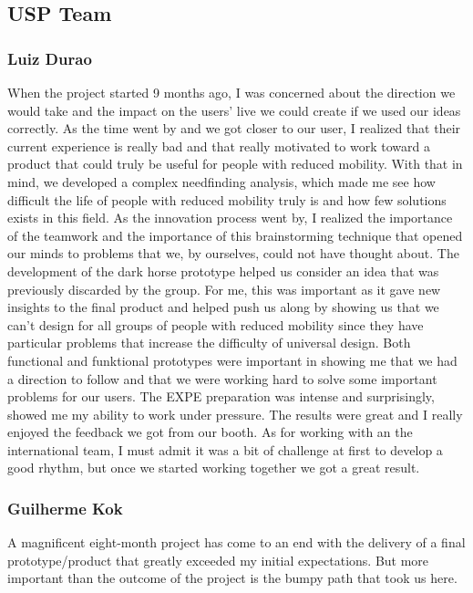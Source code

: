 \subsection{USP Team}

\subsubsection{Luiz Durao}

        	When the project started 9 months ago, I was concerned about the direction we would take and the impact on the users' live we could create if we used our ideas correctly. As the time went by and we got closer to our user, I realized that their current experience is really bad and that really motivated to work toward a product that could truly be useful for people with reduced mobility. With that in mind, we developed a complex needfinding analysis, which made me see how difficult the life of people with reduced mobility truly is and how few solutions exists in this field. As the innovation process went by, I realized the importance of the teamwork and the importance of this brainstorming technique that opened our minds to problems that we, by ourselves, could not have thought about. The development of the dark horse prototype helped us consider an idea that was previously discarded by the group. For me, this was important as it gave new insights to the final product and helped push us along by showing us that we can’t design for all groups of people with reduced mobility since they have particular problems that increase the difficulty of universal design. Both functional and funktional prototypes were important in showing me that we had a direction to follow and that we were working hard to solve some important problems for our users.  The EXPE preparation was intense and surprisingly, showed me my ability to work under pressure. The results were great and I really enjoyed the feedback we got from our booth. As for working with an the international team, I must admit it was a bit of challenge at first to develop a good rhythm, but once we started working together we got a great result.

\subsubsection{Guilherme Kok}
A magnificent eight-month project has come to an end with the delivery of a final prototype/product that greatly exceeded my initial expectations. But more important than the outcome of the project is the bumpy path that took us here.

